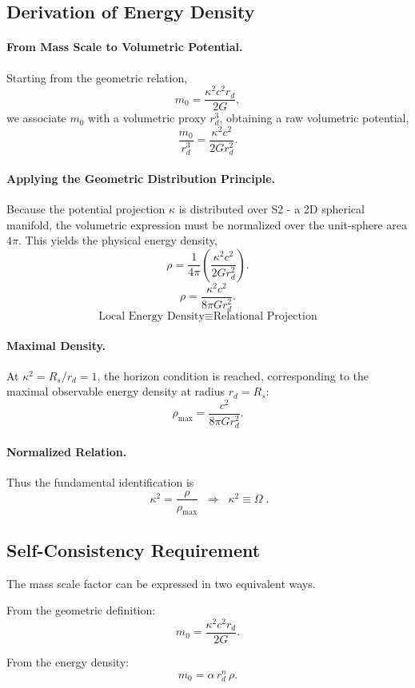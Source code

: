 \documentclass[12pt, a4paper]{article}
\begin{document}
\subsection{Derivation of Energy Density}

\paragraph{From Mass Scale to Volumetric Potential.}
Starting from the geometric relation,
\[
m_0 = \frac{\kappa^2 c^2 r_d}{2G},
\]
we associate $m_0$ with a volumetric proxy $r_d^3$, obtaining a raw volumetric potential,
\[
\frac{m_0}{r_d^3} = \frac{\kappa^2 c^2}{2G r_d^2}.
\]

\paragraph{Applying the Geometric Distribution Principle.}
Because the potential projection $\kappa$ is distributed over S2  -  a 2D spherical manifold, the volumetric expression must be normalized over the unit-sphere area $4\pi$. This yields the physical energy density,
\[
\rho = \frac{1}{4\pi}\left(\frac{\kappa^2 c^2}{2G r_d^2}\right) 
.
\]
\[
\rho = \frac{\kappa^2c^2}{8\pi G r_d^2}.
\]
$$\text{Local Energy Density} \equiv \text{Relational Projection}$$

\paragraph{Maximal Density.}
At $\kappa^2 = R_s/r_d = 1$, the horizon condition is reached, corresponding to the maximal observable energy density at radius $r_d=R_s$:
\[
\rho_{\max} = \frac{c^2}{8\pi G r_d^2}.
\]
\paragraph{Normalized Relation.}
Thus the fundamental identification is
\[
\boxed{\;\kappa^2 = \frac{\rho}{\rho_{\max}} \;\;\Rightarrow\;\; \kappa^2 \equiv \Omega\;}.
\]

\subsection{Self-Consistency Requirement}

The mass scale factor can be expressed in two equivalent ways.

From the geometric definition:
\[
m_0 = \frac{\kappa^2 c^2 r_d}{2G}.
\]

From the energy density:
\[
m_0 = \alpha \, r_d^n \, \rho.
\]
\end{document}
